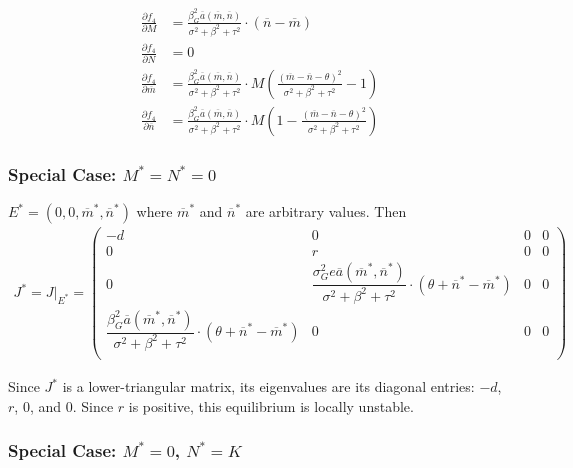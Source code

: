 \documentclass[10pt]{beamer}
\begin{document}
\begin{align*}
	\frac{\partial f_4}{\partial M} &= \frac{\beta_G^2\overline{a}(\overline{m}, \overline{n})}{\sigma^2 + \beta^2 + \tau^2} \cdot (\overline{n} - \overline{m}) \\[.15cm]
	\frac{\partial f_4}{\partial N} &= 0 \\[.15cm]
	\frac{\partial f_4}{\partial \overline{m}} &= \frac{\beta_G^2\overline{a}(\overline{m}, \overline{n})}{\sigma^2 + \beta^2 + \tau^2} \cdot M\left(\frac{(\overline{m} - \overline{n} - \theta)^2}{\sigma^2 + \beta^2 + \tau^2} - 1\right) \\[.15cm]
	\frac{\partial f_4}{\partial \overline{n}} &= \frac{\beta_G^2\overline{a}(\overline{m}, \overline{n})}{\sigma^2 + \beta^2 + \tau^2} \cdot M\left(1 - \frac{(\overline{m} - \overline{n} - \theta)^2}{\sigma^2 + \beta^2 + \tau^2}\right)
\end{align*}

							\subsubsection{Special Case: $M^* = N^* = 0$}

$E^* = (0, 0, \overline{m}^*, \overline{n}^*)$ where $\overline{m}^*$ and $\overline{n}^*$ are arbitrary values.  Then
\begin{align*}
	J^* = J\big|_{E^*} = \left(
	\begin{array}{cccc}
		-d & 0 & 0 & 0 \\[.4cm]
		0 & r & 0 & 0 \\[.4cm]
		0 & \dfrac{\sigma_G^2e\overline{a}(\overline{m}^*, \overline{n}^*)}{\sigma^2 + \beta^2 + \tau^2} \cdot (\theta + \overline{n}^* - \overline{m}^*) & 0 & 0 \\[.4cm]
		\dfrac{\beta_G^2\overline{a}(\overline{m}^*, \overline{n}^*)}{\sigma^2 + \beta^2 + \tau^2} \cdot (\theta + \overline{n}^* - \overline{m}^*) & 0 & 0 & 0 \\
	\end{array}
	\right)
\end{align*}

\vskip 10pt

\noindent Since $J^*$ is a lower-triangular matrix, its eigenvalues are its diagonal entries: $-d$, $r$, $0$, and $0$.  Since $r$ is positive, this equilibrium is locally unstable.

							\subsubsection{Special Case: $M^* = 0$, $N^* = K$}
\end{document}
